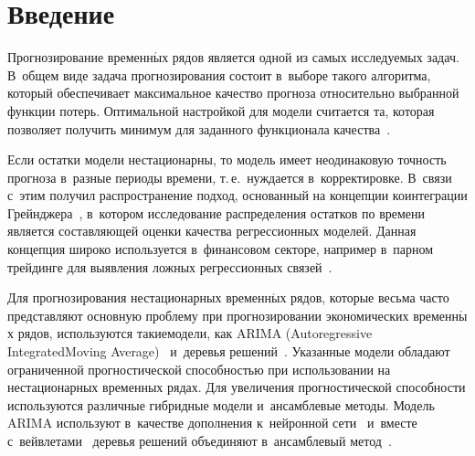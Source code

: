 \thispagestyle{headings}

\begin{multicols}{2}

\label{st\stat}
    

\section{Введение}


Прогнозирование временн$\acute{\mbox{ы}}$х рядов является одной из самых исследуемых задач. 
В~общем виде задача прогнозирования состоит в~выборе такого алгоритма, 
который обеспечивает максимальное качество прогноза относительно выбранной функции потерь. 
Оптимальной настройкой для модели считается та, которая позволяет получить минимум для заданного 
функционала качества~\cite{1-kr}.

Если остатки модели нестационарны, то модель имеет неодинаковую точность прогноза в~разные 
периоды времени, т.\,е.\ нуждается в~корректировке. 
В~связи с~этим получил распространение подход, основанный на концепции коинтеграции Грейнд\-же\-ра~\cite{2-kr}, 
в~котором исследование распределения остатков по времени является составляющей оценки качества 
регрессионных моделей. Данная концепция широко используется в~финансовом секторе, например в~парном 
трейдинге для выявления ложных регрессионных связей~\cite{3-kr}.

Для прогнозирования нестационарных вре\-мен\-н$\acute{\mbox{ы}}$х рядов, которые весьма часто пред\-став\-ля\-ют основную 
проб\-ле\-му при прогнозировании экономических вре\-мен\-н$\acute{\mbox{ы}}$х рядов, используются такие\linebreak модели,
 как \mbox{ARIMA} (Autoregressive Integrated\linebreak Moving Average)~\cite{4-kr, 5-kr} и~деревья решений~\cite{6-kr, 7-kr}. 
 Указанные модели обладают ограниченной прогностической спо\-соб\-ностью при использовании на 
 нестационарных временных рядах. Для увеличения прогностической способности используются 
 различные гибридные модели и~ан\-самб\-ле\-вые методы. Модель ARIMA используют в~качестве 
 дополнения к~нейронной сети~\cite{8-kr, 9-kr, 10-kr} и~вместе с~вейвлетами~\cite{11-kr, 12-kr} 
 деревья решений объединяют в~ан\-самб\-ле\-вый метод~\cite{13-kr, 14-kr}.



\end{multicols}
